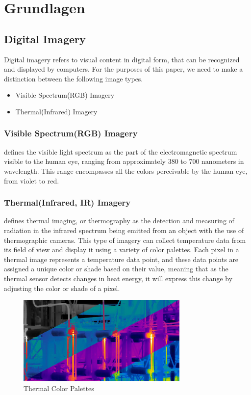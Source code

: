 \chapter{Grundlagen}

\section{Digital Imagery}
Digital imagery refers to visual content in digital form, that can be recognized and displayed by computers. For the purposes of this paper, we need to make a distinction between the following image types.

\begin{itemize}
	\item{Visible Spectrum(RGB) Imagery}
	\item{Thermal(Infrared) Imagery}
\end{itemize}

\subsection{Visible Spectrum(RGB) Imagery}

\cite{nasa_visiblelight} defines the visible light spectrum as the part of the electromagnetic spectrum visible to the human eye, ranging from approximately 380 to 700 nanometers in wavelength. This range encompasses all the colors perceivable by the human eye, from violet to red.

\subsection{Thermal(Infrared, IR) Imagery}
\cite{spi_thermal} defines thermal imaging, or thermography as the detection and measuring of radiation in the infrared spectrum being emitted from an object with the use of thermographic cameras. This type of imagery can collect temperature data from its field of view and display it using a variety of color palettes. Each pixel in a thermal image represents a temperature data point, and these data points are assigned a unique color or shade based on their value, meaning that as the thermal sensor detects changes in heat energy, it will express this change by adjusting the color or shade of a pixel. \citep{flir_colorpalette}

\begin{figure}[!ht]
	\centering
		\includegraphics[width=0.75\textwidth]{images/color-palette-1200x628-fixed.png}
	\caption{Thermal Color Palettes \citep{flir_colorpalette}}
	\label{fig:color-palette}
\end{figure}

